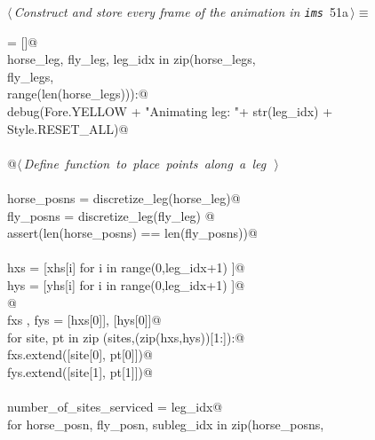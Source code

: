\documentclass[11.5pt]{report}
\begin{document}
\begin{flushleft} \small
\begin{minipage}{\linewidth}\label{scrap74}\raggedright\small
{} $\langle\,${\itshape Construct and store every frame of the animation in \verb|ims|}\nobreak\ {\footnotesize {51a}}$\,\rangle\equiv$
\vspace{-1ex}
\begin{list}{}{} \item
\mbox{}\verb@ims = []@\\
\mbox{}\verb@for horse_leg, fly_leg, leg_idx in zip(horse_legs, \@\\
\mbox{}\verb@                                       fly_legs,   \@\\
\mbox{}\verb@                                       range(len(horse_legs))):@\\
\mbox{}\verb@     debug(Fore.YELLOW + "Animating leg: "+ str(leg_idx) + Style.RESET_ALL)@\\
\mbox{}\verb@@\\
\mbox{}\verb@     @\hbox{$\langle\,${\itshape Define function to place points along a leg}\nobreak\ {\footnotesize {}}$\,\rangle$}\verb@@\\
\mbox{}\verb@@\\
\mbox{}\verb@     horse_posns = discretize_leg(horse_leg)@\\
\mbox{}\verb@     fly_posns   = discretize_leg(fly_leg) @\\
\mbox{}\verb@     assert(len(horse_posns) == len(fly_posns))@\\
\mbox{}\verb@@\\
\mbox{}\verb@     hxs = [xhs[i] for i in range(0,leg_idx+1) ]@\\
\mbox{}\verb@     hys = [yhs[i] for i in range(0,leg_idx+1) ]@\\
\mbox{}\verb@           @\\
\mbox{}\verb@     fxs , fys = [hxs[0]], [hys[0]]@\\
\mbox{}\verb@     for site, pt in zip (sites,(zip(hxs,hys))[1:]):@\\
\mbox{}\verb@          fxs.extend([site[0], pt[0]])@\\
\mbox{}\verb@          fys.extend([site[1], pt[1]])@\\
\mbox{}\verb@@\\
\mbox{}\verb@     number_of_sites_serviced = leg_idx@\\
\mbox{}\verb@     for horse_posn, fly_posn, subleg_idx in zip(horse_posns, \@\\

\end{list}
\end{minipage}
\end{flushleft}
\end{document}
